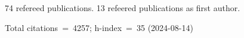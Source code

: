 74 refereed publications. 13 refeered publications as first author.

Total citations~=~4257; h-index~=~35 (2024-08-14)